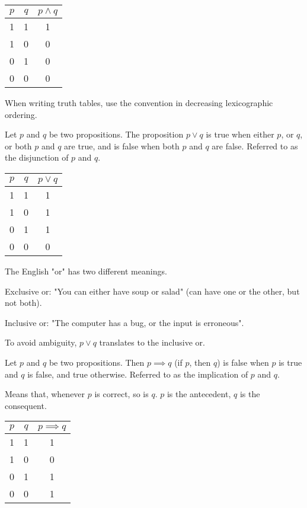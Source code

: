 \documentclass{article}
\begin{document}
\begin{table}[h]
    \centering
    \begin{tabular}{|c|c|c|} \hline
    $p$ & $q$ & $p \wedge q$\\ \hline
    1 & 1 & 1 \\ \hline
    1 & 0 & 0 \\ \hline 
    0 & 1 & 0 \\ \hline 
    0 & 0 & 0 \\ \hline
    \end{tabular}
\end{table}

When writing truth tables, use the convention in decreasing lexicographic ordering. 

Let $p$ and $q$ be two propositions. The proposition $p \vee q$ is true when either $p$, or $q$, or both $p$ and $q$ are true, and is false when both $p$ and $q$ are false. Referred to as the disjunction of $p$ and $q$. 

\begin{table}[h]
    \centering
    \begin{tabular}{|c|c|c|} \hline
    $p$ & $q$ & $p \vee q$\\ \hline
    1 & 1 & 1 \\ \hline
    1 & 0 & 1 \\ \hline 
    0 & 1 & 1 \\ \hline 
    0 & 0 & 0 \\ \hline
    \end{tabular}
\end{table}

The English "or" has two different meanings. 

Exclusive or: "You can either have soup or salad" (can have one or the other, but not both). 

Inclusive or: "The computer has a bug, or the input is erroneous".

To avoid ambiguity, $p \vee q$ translates to the inclusive or. 

Let $p$ and $q$ be two propositions. Then $p \implies q$ (if $p$, then $q$) is false when $p$ is true and $q$ is false, and true otherwise. Referred to as the implication of $p$ and $q$. 

Means that, whenever $p$ is correct, so is $q$. $p$ is the antecedent, $q$ is the consequent. 

\begin{table}[h]
    \centering
    \begin{tabular}{|c|c|c|} \hline
    $p$ & $q$ & $p \implies q$\\ \hline
    1 & 1 & 1 \\ \hline
    1 & 0 & 0 \\ \hline 
    0 & 1 & 1 \\ \hline 
    0 & 0 & 1 \\ \hline
    \end{tabular}
\end{table}
\end{document}

